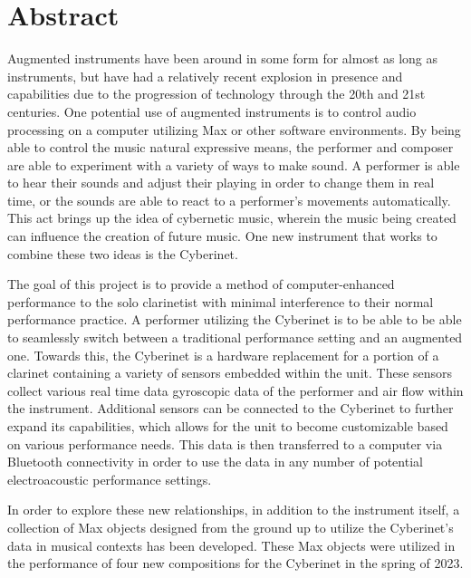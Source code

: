 \tableofcontents



 \listoffigures


\chapter{Abstract}


Augmented instruments have been around in some form for almost as long as instruments, but have had a relatively recent explosion in presence and capabilities due to the progression of technology through the 20th and 21st centuries. One potential use of augmented instruments is to control audio processing on a computer utilizing Max or other software environments. By being able to control the music natural expressive means, the performer and composer are able to experiment with a variety of ways to make sound. A performer is able to hear their sounds and adjust their playing in order to change them in real time, or the sounds are able to react to a performer's movements automatically. This act brings up the idea of cybernetic music, wherein the music being created can influence the creation of future music. One new instrument that works to combine these two ideas is the Cyberinet.

The goal of this project is to provide a method of computer-enhanced performance to the solo clarinetist with minimal interference to their normal performance practice. A performer utilizing the Cyberinet is to be able to be able to seamlessly switch between a traditional performance setting and an augmented one. Towards this, the Cyberinet is a hardware replacement for a portion of a clarinet containing a variety of sensors embedded within the unit. These sensors collect various real time data gyroscopic data of the performer and air flow within the instrument. Additional sensors can be connected to the Cyberinet to further expand its capabilities, which allows for the unit to become customizable based on various performance needs. This data is then transferred to a computer via Bluetooth connectivity in order to use the data in any number of potential electroacoustic performance settings. 

In order to explore these new relationships, in addition to the instrument itself, a collection of Max objects designed from the ground up to utilize the Cyberinet’s data in musical contexts has been developed. These Max objects were utilized in the performance of four new compositions for the Cyberinet in the spring of 2023.

